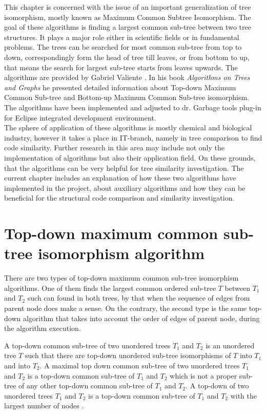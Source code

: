 \documentclass{report}
\begin{document}
This chapter is concerned with the issue of an important generalization of tree isomorphism, mostly known as Maximum Common Subtree Isomorphism. The goal of these algorithms is finding a largest common sub-tree between two tree structures. It plays a major role either in scientific fields or in fundamental problems. The trees can be searched for most common sub-tree from top to down, correspondingly form the head of tree till leaves, or from bottom to up, that means the search for largest sub-tree starts from leaves upwards. The algorithms are provided by Gabriel Valiente \cite{valiente}. In his book \emph{Algorithms on Trees and Graphs} he presented detailed information about Top-down Maximum Common Sub-tree and Bottom-up Maximum Common Sub-tree isomorphism. The algorithms have been implemented and adjusted to dr. Garbage tools plug-in for Eclipse integrated development environment.
\\
The sphere of application of these algorithms is mostly chemical and biological industry, however it takes a place in IT-branch, namely in tree comparison to find code similarity. Further research in this area may include not only the implementation of algorithms but also their application field. On these grounds, that the algorithms can be very helpful for tree similarity investigation. The current chapter includes an explanation of how these two algorithms have implemented in the project, about auxiliary algorithms and how they can be beneficial for the structural code comparison and similarity investigation.

\section{Top-down maximum common sub-tree isomorphism algorithm}
\label{sec:topdown}

There are two types of top-down maximum common sub-tree isomorphism algorithms. One of them finds the largest common ordered sub-tree $T$ between $ T_{1}$ and $ T_{2}$ such can found in both trees, by that when the sequence of edges from parent node does make a sense. On the contrary, the second type is the same top-down algorithm that takes into account the order of edges of parent node, during the algorithm execution. 

A top-down common sub-tree of two unordered trees $ T_{1}$ and $ T_{2 }$ is an unordered tree $T$ such that there are top-down unordered sub-tree isomorphisms of $ T$ into $ T_{1}$ and into $ T_{2}$. A maximal top down common sub-tree of two unordered  trees $ T_{1}$ and $ T_{2}$ is a top-down common sub-tree of $ T_{1}$ and $ T_{2}$ which is not a proper sub-tree of any other top-down common sub-tree of $ T_{1}$ and $ T_{2}$. A top-down of two unordered trees $ T_{1}$ and $ T_{2}$ is a top-down common sub-tree of $ T_{1}$ and $ T_{2}$ with the largest number of nodes \cite{valiente}.
\end{document}

